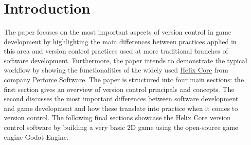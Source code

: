 \section{Introduction}
  \paragraph{}
  The paper focuses on the most important aspects of version control in game development by highlighting the main 
  differences between practices applied in this area and version control practices used at more traditional branches 
  of software development. Furthermore, the paper intends to demonstrate the typical workflow by showing the 
  functionalities of the widely used \href{https://www.perforce.com/products/helix-core}{Helix Core\textsuperscript{\texttrademark}} 
  from company \href{https://www.perforce.com/}{Perforce Software}.  
  The paper is structured into four main sections: the first section gives an overview of version control principals and
  concepts. The second discusses the most important differences between software development and game development and 
  how these translate into practice when it comes to version control.
  The following final sections showcase the Helix Core\textsuperscript{\texttrademark} version control software by building
  a very basic 2D game using the open-source game engine Godot Engine.